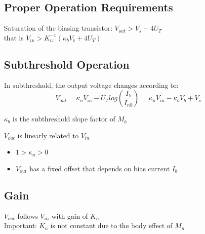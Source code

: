 \documentclass[main]{subfiles}
\begin{document}
\subsection{Proper Operation Requirements}
Saturation of the biasing transistor: $V_{out} > V_s + 4U_T$\\
that is $V_{in} > K_{n}^{-1}(\kappa_b V_b + 4U_T)$

\subsection{Subthreshold Operation}
In subthreshold, the output voltage changes according to:
\begin{equation}
V_{out}=\kappa_n V_{in} - U_T log(\frac{I_b}{I_{n0}}) = \kappa_n V_{in} - \kappa_b V_b + V_s
\end{equation}
\begin{center}
$\kappa_b$ is the subthreshold slope factor of $M_b$\\
\end{center}
$V_{out}$ is linearly related to $V_{in}$
\begin{itemize}[label={}]
\item $1 >\kappa_n >0$
\item $V_{out}$ has a fixed offset that depends on bias current $I_b$
\end{itemize}

\subsection{Gain}
$V_{out}$ follows $V_{in}$ with gain of $K_n$\\
Important: $K_n$ is not constant due to the body effect of $M_n$

\end{document}
